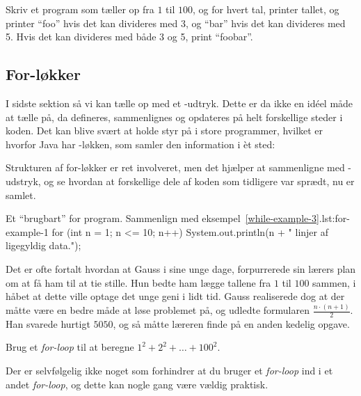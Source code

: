		\begin{exercise}
			Skriv et program som tæller op fra \(1\) til \(100\), og for hvert
			tal, printer tallet, og printer ``foo'' hvis det kan divideres med 3,
			og ``bar'' hvis det kan divideres med 5. Hvis det kan divideres med
			både 3 og 5, print ``foobar''.
		\end{exercise}

	\subsection{For-løkker}

		I sidste sektion så vi kan tælle op med et -udtryk.
		Dette er da ikke en idéel måde at tælle på, da 
		defineres, sammenlignes og opdateres på helt forskellige steder i koden.
		Det kan blive svært at holde styr på i store programmer, hvilket er
		hvorfor Java har -løkken, som samler den information i
		èt sted: 


		Strukturen af for-løkker er ret involveret, men det hjælper at
		sammenligne med -udstryk, og se hvordan at forskellige
		dele af koden som tidligere var sprædt, nu er samlet.

		\begin{JavaCode}{Et ``brugbart'' for program. Sammenlign med eksempel~\ref{while-example-3}.}{lst:for-example-1}
			for (int n = 1; n <= 10; n++) {
				System.out.println(n + " linjer af ligegyldig data.");
			}
		\end{JavaCode}

		\begin{exercise}
			Det er ofte fortalt hvordan at Gauss i sine unge dage, forpurrerede sin
			lærers plan om at få ham til at tie stille. Hun bedte ham lægge tallene
			fra \(1\) til \(100\) sammen, i håbet at dette ville optage det unge
			geni i lidt tid. Gauss realiserede dog at der måtte være en bedre måde
			at løse problemet på, og udledte formularen \(\frac{n\cdot(n+1)}{2}\).
			Han svarede hurtigt \(5050\), og så måtte læreren finde på en anden
			kedelig opgave.

			Brug et \emph{for-loop} til at beregne \(1^2+2^2+\dots+100^2\).
		\end{exercise}

		\begin{exercise}
			Der er selvfølgelig ikke noget som forhindrer at du bruger et
			\emph{for-loop} ind i et andet \emph{for-loop}, og dette kan nogle gang
			være vældig praktisk.

		\end{exercise}

